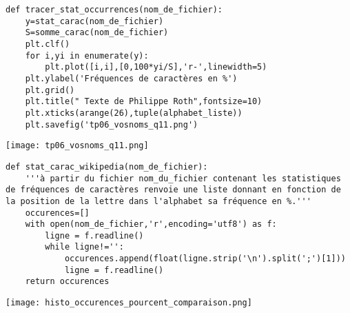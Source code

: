 \question{}

\begin{minipage}{0.5\textwidth}

\begin{lstlisting}
def tracer_stat_occurrences(nom_de_fichier):
    y=stat_carac(nom_de_fichier)
    S=somme_carac(nom_de_fichier)
    plt.clf()
    for i,yi in enumerate(y):
        plt.plot([i,i],[0,100*yi/S],'r-',linewidth=5)
    plt.ylabel('Fréquences de caractères en %')
    plt.grid()
    plt.title(" Texte de Philippe Roth",fontsize=10)
    plt.xticks(arange(26),tuple(alphabet_liste))
    plt.savefig('tp06_vosnoms_q11.png')
\end{lstlisting}

\end{minipage}
\begin{minipage}{0.5\textwidth}
\begin{center}
\texttt{[image: tp06\_vosnoms\_q11.png]}
\end{center}
\end{minipage}

\question{}



\begin{lstlisting}
def stat_carac_wikipedia(nom_de_fichier):
    '''à partir du fichier nom_du_fichier contenant les statistiques de fréquences de caractères renvoie une liste donnant en fonction de la position de la lettre dans l'alphabet sa fréquence en %.'''
    occurences=[]
    with open(nom_de_fichier,'r',encoding='utf8') as f:
        ligne = f.readline()
        while ligne!='':
            occurences.append(float(ligne.strip('\n').split(';')[1]))
            ligne = f.readline()
    return occurences
\end{lstlisting}


\question{} 

\begin{center}
\texttt{[image: histo\_occurences\_pourcent\_comparaison.png]}
\end{center}


